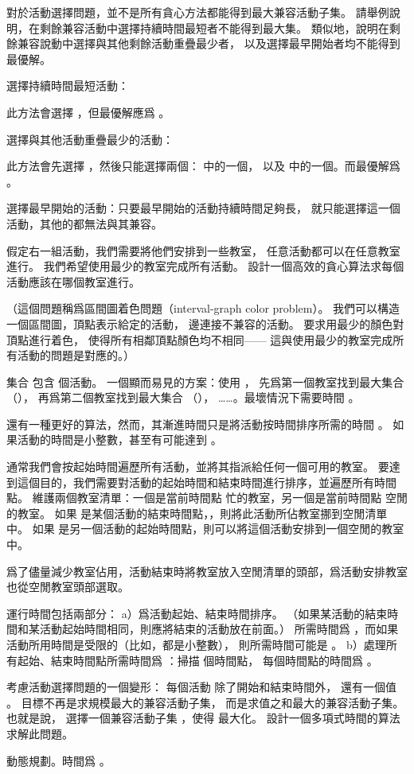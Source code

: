 \startEXERCISE
對於活動選擇問題，並不是所有貪心方法都能得到最大兼容活動子集。
請舉例說明，在剩餘兼容活動中選擇持續時間最短者不能得到最大集。
類似地，說明在剩餘兼容說動中選擇與其他剩餘活動重疊最少者，
以及選擇最早開始者均不能得到最優解。
\stopEXERCISE

\startANSWER
選擇持續時間最短活動：

此方法會選擇 ，但最優解應爲 。

選擇與其他活動重疊最少的活動：

此方法會先選擇 ，然後只能選擇兩個：  中的一個，
以及  中的一個。而最優解爲 。

選擇最早開始的活動：只要最早開始的活動持續時間足夠長，
就只能選擇這一個活動，其他的都無法與其兼容。
\stopANSWER

\startEXERCISE
假定右一組活動，我們需要將他們安排到一些教室，
任意活動都可以在任意教室進行。
我們希望使用最少的教室完成所有活動。
設計一個高效的貪心算法求每個活動應該在哪個教室進行。

（這個問題稱爲{\EMP 區間圖着色問題}（interval-graph color problem）。
我們可以構造一個區間圖，頂點表示給定的活動，
邊連接不兼容的活動。
要求用最少的顏色對頂點進行着色，
使得所有相鄰頂點顏色均不相同——
這與使用最少的教室完成所有活動的問題是對應的。）
\stopEXERCISE

\startANSWER
集合  包含  個活動。
一個顯而易見的方案：使用 ，
先爲第一個教室找到最大集合  （），
再爲第二個教室找到最大集合  （），
……。最壞情況下需要時間 。

還有一種更好的算法，然而，其漸進時間只是將活動按時間排序所需的時間 。
如果活動的時間是小整數，甚至有可能達到 。

通常我們會按起始時間遍歷所有活動，並將其指派給任何一個可用的教室。
要達到這個目的，我們需要對活動的起始時間和結束時間進行排序，並遍歷所有時間點。
維護兩個教室清單：一個是當前時間點  忙的教室，另一個是當前時間點  空閒的教室。
如果  是某個活動的結束時間點，，則將此活動所佔教室挪到空閒清單中。
如果  是另一個活動的起始時間點，則可以將這個活動安排到一個空閒的教室中。

爲了儘量減少教室佔用，活動結束時將教室放入空閒清單的頭部，爲活動安排教室也從空閒教室頭部選取。

運行時間包括兩部分： a）爲活動起始、結束時間排序。
（如果某活動的結束時間和某活動起始時間相同，則應將結束的活動放在前面。）
所需時間爲 ，而如果活動所用時間是受限的（比如，都是小整數），
則所需時間可能是 。
 b）處理所有起始、結束時間點所需時間爲 ：掃描  個時間點，
 每個時間點的時間爲 。
\stopANSWER

\startEXERCISE
考慮活動選擇問題的一個變形：
每個活動  除了開始和結束時間外，
還有一個值 。
目標不再是求規模最大的兼容活動子集，
而是求值之和最大的兼容活動子集。
也就是說，
選擇一個兼容活動子集 ，使得  最大化。
設計一個多項式時間的算法求解此問題。
\stopEXERCISE

\startANSWER
動態規劃。時間爲 。
\stopANSWER

\stopsection
